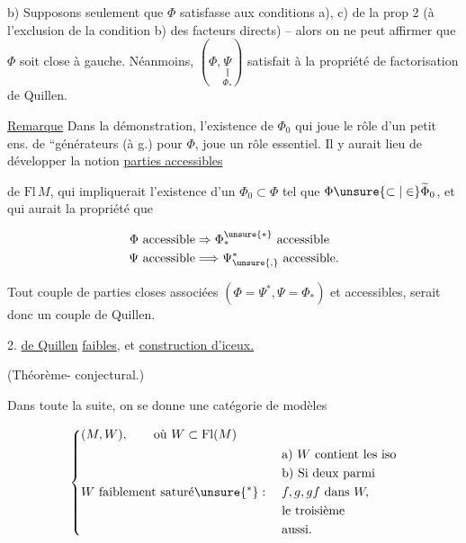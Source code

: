 b) Supposons seulement que $\Phi$ satisfasse aux conditions a), c) de la prop 2 (à l'exclusion de la condition b) des facteurs directs) -- alors on ne peut affirmer que $\Phi$ soit close à gauche. Néanmoins, $(\Phi,\underset{\Phi_*}{\underset{\Vert}{\Psi}})$ satisfait à la propriété de factorisation de Quillen.

\uline{Remarque} Dans la démonstration, l'existence de  $\Phi_0$\inserted{$\subset\Phi$,} qui joue le rôle d'un petit ens. de ``générateurs  (à g.) pour $\Phi$, joue un rôle essentiel. Il y aurait lieu de développer la notion  \uline{parties accessibles}




de $\mathrm{Fl}\,M$, qui impliquerait l'existence d'un  $\Phi_0\subset\Phi$ tel que $\Phi\unsure{\subset|\in}\widetilde\Phi_0$, et qui aurait la propriété que

\[ \begin{aligned}\Phi\ \text{accessible}&\Rightarrow\Phi_*^{\unsure{*}}\ \text{accessible}\\ \Psi\ \text{accessible}&\Longrightarrow\Psi_{\unsure{,}}^*\ \text{accessible}.\end{aligned} \]

Tout couple \inserted{$(\Phi,\Psi)$} de parties closes  associées \deleted{\unsure{$\Phi=\Psi^*$}} $(\Phi=\Psi^*,\Psi=\Phi_*)$ et accessibles, serait donc un couple de Quillen.

2. \uline{  de Quillen} \uline{faibles}, et \uline{construction d'iceux.}

(Théorème- conjectural.)

Dans toute la suite, on se donne une catégorie de modèles

\[ \left\{\begin{aligned}&(M,W),\qquad\text{où }W\subset\mathrm{Fl}(M)\\ &W\ \text{faiblement saturé}\unsure{^{*}}:\quad\begin{aligned}&\text{a) } W\text{ contient les iso}\\ &\text{b) Si deux parmi}\\ &f,g,gf\text{ dans }W,\\ &\text{le troisième}\\ &\text{aussi.}\end{aligned}\end{aligned}\right. \]

